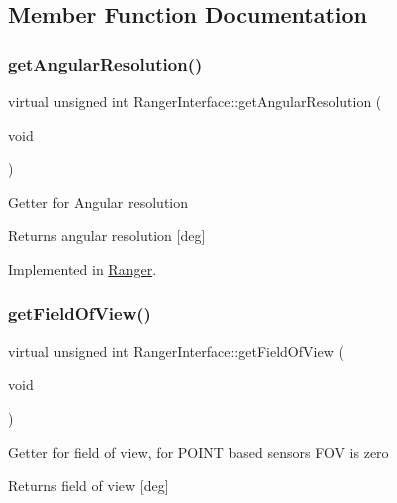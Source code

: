 \subsection{Member Function Documentation}
\mbox{\label{classRangerInterface_a37d4f89daffa8b2708dfc11034893552}} 
\subsubsection{\texorpdfstring{get\+Angular\+Resolution()}{getAngularResolution()}}
{\footnotesize\ttfamily virtual unsigned int Ranger\+Interface\+::get\+Angular\+Resolution (\begin{DoxyParamCaption}\item[{void}]{ }\end{DoxyParamCaption})\hspace{0.3cm}{\ttfamily [pure virtual]}}

Getter for Angular resolution \begin{DoxyReturn}{Returns}
angular resolution \mbox{[}deg\mbox{]} 
\end{DoxyReturn}


Implemented in \hyperlink{classRanger_a95b5013ae191d1e19b93fab002306718}{Ranger}.

\mbox{\label{classRangerInterface_a18716da6932402b8dda75f682be6f06c}} 
\subsubsection{\texorpdfstring{get\+Field\+Of\+View()}{getFieldOfView()}}
{\footnotesize\ttfamily virtual unsigned int Ranger\+Interface\+::get\+Field\+Of\+View (\begin{DoxyParamCaption}\item[{void}]{ }\end{DoxyParamCaption})\hspace{0.3cm}{\ttfamily [pure virtual]}}

Getter for field of view, for P\+O\+I\+NT based sensors F\+OV is zero \begin{DoxyReturn}{Returns}
field of view \mbox{[}deg\mbox{]} 
\end{DoxyReturn}


